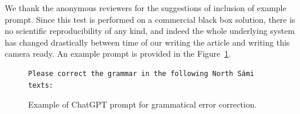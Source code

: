 \documentclass[free]{flammie}
\begin{document}
We thank the anonymous reviewers for the suggestions of inclusion of example
prompt. Since this test is performed on a commercial black box solution, there
is no scientific reproducibility of any kind, and indeed the whole underlying
system has changed drastically between time of our writing the article and
writing this camera ready. An example prompt is provided in the
Figure~\ref{prompt}.

\begin{figure}
\scriptsize
    \begin{verbatim}
Please correct the grammar in the following North Sámi texts:
    \end{verbatim}
    \caption{Example of ChatGPT prompt for grammatical error
    correction.\label{prompt}}
\end{figure}



\end{document}
